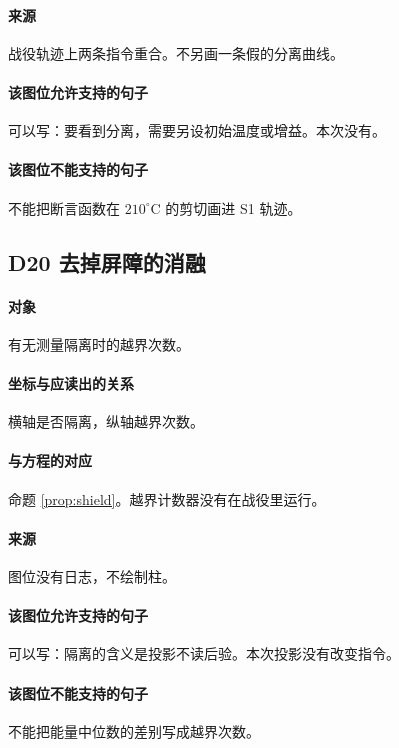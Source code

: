 \paragraph{来源}
战役轨迹上两条指令重合。不另画一条假的分离曲线。

\paragraph{该图位允许支持的句子}
可以写：要看到分离，需要另设初始温度或增益。本次没有。

\paragraph{该图位不能支持的句子}
不能把断言函数在 $210^\circ\mathrm{C}$ 的剪切画进 S1 轨迹。

\subsection{D20 去掉屏障的消融}
\paragraph{对象}
有无测量隔离时的越界次数。

\paragraph{坐标与应读出的关系}
横轴是否隔离，纵轴越界次数。

\paragraph{与方程的对应}
命题 \ref{prop:shield}。越界计数器没有在战役里运行。

\paragraph{来源}
图位没有日志，不绘制柱。

\paragraph{该图位允许支持的句子}
可以写：隔离的含义是投影不读后验。本次投影没有改变指令。

\paragraph{该图位不能支持的句子}
不能把能量中位数的差别写成越界次数。

